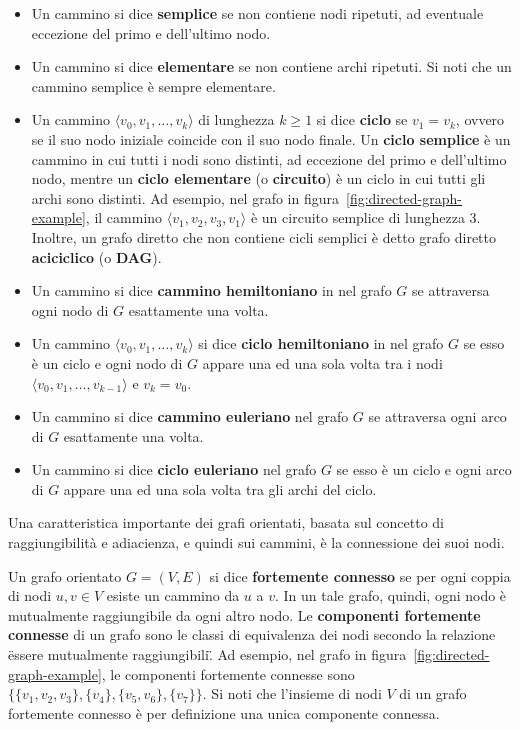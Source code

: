 \begin{itemize}
    \item Un cammino si dice \textbf{semplice} se non contiene nodi ripetuti, ad eventuale eccezione del primo e
    dell'ultimo nodo.
    \item Un cammino si dice \textbf{elementare} se non contiene archi ripetuti. Si noti che un cammino semplice \`e
    sempre elementare.
    \item Un cammino $\langle v_0, v_1, \ldots, v_k \rangle$ di lunghezza $k \geq 1$ si dice \textbf{ciclo} se $v_1 = v_k$, ovvero se il
    suo nodo iniziale coincide con il suo nodo finale.
    Un \textbf{ciclo semplice} \`e un cammino in cui tutti i nodi sono distinti, ad eccezione del primo e dell'ultimo
    nodo, mentre un \textbf{ciclo elementare} (o \textbf{circuito}) \`e un ciclo in cui tutti gli archi sono distinti.
    Ad esempio, nel grafo in figura~\ref{fig:directed-graph-example}, il cammino $\langle v_1, v_2, v_3, v_1 \rangle$
    \`e un circuito semplice di lunghezza 3.
    Inoltre, un grafo diretto che non contiene cicli semplici \`e detto grafo diretto \textbf{aciciclico} (o
    \textbf{DAG}).
    \item Un cammino si dice \textbf{cammino hemiltoniano} in nel grafo $G$ se attraversa ogni nodo di $G$ esattamente
    una volta.
    \item Un cammino $\langle v_0, v_1, \ldots, v_k \rangle$ si dice \textbf{ciclo hemiltoniano} in nel grafo $G$ se
    esso \`e un ciclo e ogni nodo di $G$ appare una ed una sola volta tra i nodi $\langle v_0, v_1, \ldots,
    v_{k-1}\rangle$ e $v_k = v_0$.
    \item Un cammino si dice \textbf{cammino euleriano} nel grafo $G$ se attraversa ogni arco di $G$ esattamente una
    volta.
    \item Un cammino si dice \textbf{ciclo euleriano} nel grafo $G$ se esso \`e un ciclo e ogni arco di $G$ appare una
    ed una sola volta tra gli archi del ciclo.
\end{itemize}


Una caratteristica importante dei grafi orientati, basata sul concetto di raggiungibilit\`a e adiacienza, e quindi
sui cammini, \`e la connessione dei suoi nodi.
\newline

Un grafo orientato $G = (V, E)$ si dice \textbf{fortemente connesso} se per ogni coppia di nodi $u, v \in V$ esiste un
cammino da $u$ a $v$. \newline
In un tale grafo, quindi, ogni nodo \`e mutualmente raggiungibile da ogni altro nodo.
Le \textbf{componenti fortemente connesse} di un grafo sono le classi di equivalenza dei nodi secondo la relazione
\"essere mutualmente raggiungibili\".
Ad esempio, nel grafo in figura~\ref{fig:directed-graph-example}, le componenti fortemente connesse sono
$\{\{v_1, v_2, v_3\}, \{v_4\}, \{v_5, v_6\}, \{v_7\}\}$.
Si noti che l'insieme di nodi $V$ di un grafo fortemente connesso \`e per definizione una unica componente connessa.
\newline

